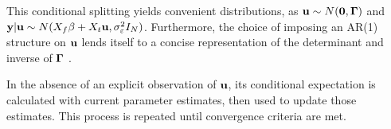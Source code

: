 This conditional splitting yields convenient distributions, as $\mathbf{u} \sim 
N(\mathbf{0},\mathbf{\Gamma})$ and $\mathbf{y}|\mathbf{u} \sim N(X_f\beta + X_t\mathbf{u},
 \sigma_\varepsilon^2I_N)$. Furthermore, the choice of imposing
 an AR(1) structure on $\mathbf{u}$ lends itself to a concise
  representation of the determinant and inverse of $\mathbf{\Gamma}$ \cite{modugno2015multilevel}.



In the absence of an explicit observation of $\mathbf{u}$, its conditional expectation
is calculated with current parameter estimates, then used to update those estimates. 
This process is repeated until convergence criteria are met.






















